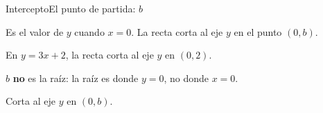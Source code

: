 \documentclass[12pt]{article}
\newcommand{\ejesbase}{%
  \draw[mwink!25, line width=0.5pt, -{Stealth[length=1.4mm]}]
    (0,0) -- (4.55,0);
  \draw[mwink!25, line width=0.5pt, -{Stealth[length=1.4mm]}]
    (0,0) -- (0,4.35);
  \node[anchor=north east, font=\fontsize{6}{6}\selectfont, text=mwink!45]
    at (4.55,0) {$x$};
  \node[anchor=north east, font=\fontsize{6}{6}\selectfont, text=mwink!45]
    at (0,4.35) {$y$};
}
\begin{document}
\begin{mwmodlamina}[mwnaranja]{Intercepto}{El punto de partida: $b$}
\noindent
\begin{minipage}[t]{4.7cm}
  \vspace*{0pt}
  \begin{mwcaja}
    {\mwsmall Es el valor de $y$ cuando $x=0$. La recta corta al
    eje $y$ en el punto $(0,b)$.}
  \end{mwcaja}
  \begin{mwcaja}
    {\mwsmall En $y=3x+2$, la recta corta al eje $y$ en
    $(0,2)$.}
  \end{mwcaja}
  \begin{mwcajaalerta}
    {\mwsmall $b$ \textbf{no} es la raíz: la raíz es donde
    $y=0$, no donde $x=0$.}
  \end{mwcajaalerta}
\end{minipage}\hfill
\begin{minipage}[t]{4.05cm}
  \vspace*{0pt}
  \begin{mwcajaformula}
  \end{mwcajaformula}
  \par\vspace{1pt}
  {\mwsmall\color{mwink!55}Corta al eje $y$ en $(0,b)$.}
\end{minipage}
\end{mwmodlamina}
\end{document}
